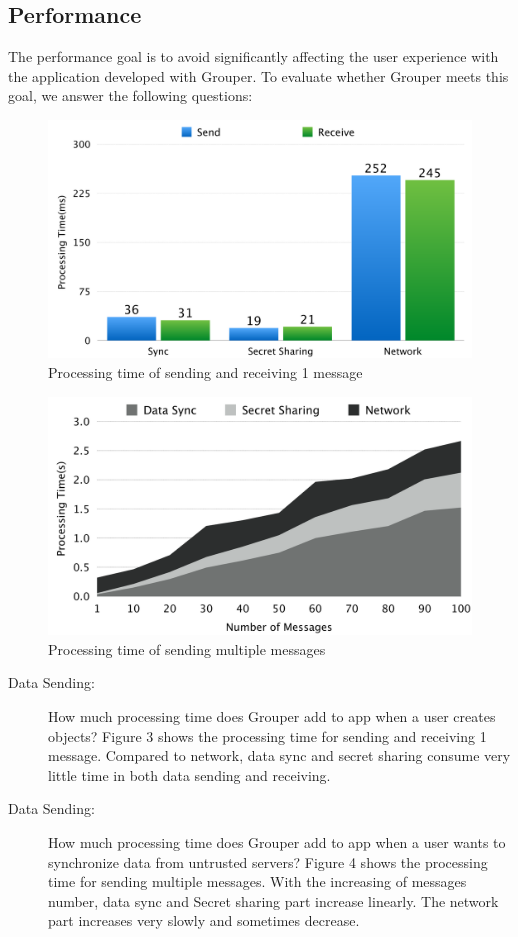 \documentclass[twocolumn,10pt]{article}
\begin{document}
\subsection{Performance}

The performance goal is to avoid significantly affecting the user experience with the application developed with Grouper. To evaluate whether Grouper meets this goal, we answer the following questions:

\begin{figure}[!htb]
	\centering
	\includegraphics[scale=0.12]{processing1}
	\caption{Processing time of sending and receiving 1 message}
\end{figure}

\begin{figure}[!htb]
	\centering
	\includegraphics[scale=0.12]{processing2}
	\caption{Processing time of sending multiple messages}
\end{figure}

\begin{description}
	\item[Data Sending:] How much processing time does Grouper add to app when a user creates objects?
	Figure 3 shows the processing time for sending and receiving 1 message. Compared to network, data sync and secret sharing consume very little time in both data sending and receiving.
	\item[Data Sending:] How much processing time does Grouper add to app when a user wants to synchronize data from untrusted servers?
	Figure 4 shows the processing time for sending multiple messages. With the increasing of messages number, data sync and Secret sharing part increase linearly. The network part increases very slowly and sometimes decrease.
\end{description}
\end{document}
